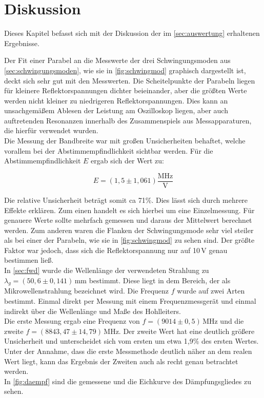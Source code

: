 

\section{Diskussion}
\label{sec:Diskussion}

Dieses Kapitel befasst sich mit der Diskussion der im \autoref{sec:auswertung} erhaltenen Ergebnisse.



Der Fit einer Parabel an die Messwerte der drei Schwingungsmoden aus \autoref{sec:schwingungsmoden}, wie sie in \autoref{fig:schwingmod} graphisch dargestellt ist, deckt sich sehr gut mit den Messwerten.
Die Scheitelpunkte der Parabeln liegen für kleinere Reflektorspannungen dichter beieinander, aber die größten Werte werden nicht kleiner zu niedrigeren Reflektorspannungen.
Dies kann an unsachgemäßem Ablesen der Leistung am Oszilloskop liegen, aber auch auftretenden Resonanzen innerhalb des Zusammenspiels aus Messapparaturen, die hierfür verwendet wurden.\\
Die Messung der Bandbreite war mit großen Unsicherheiten behaftet, welche vorallem bei der Abstimmempfindlichkeit sichtbar werden.
Für die Abstimmempfindlichkeit $E$ ergab sich der Wert zu:

\begin{equation}
E = (1,5 \pm 1,061) \frac{\text{MHz}}{\text{V}}
\label{eq:elbandbreite2}
\end{equation}

Die relative Unsicherheit beträgt somit ca 71\%. Dies lässt sich durch mehrere Effekte erklären. Zum einen handelt es sich hierbei um eine Einzelmessung.
Für genauere Werte sollte mehrfach gemessen und daraus der Mittelwert berechnet werden.
Zum anderen waren die Flanken der Schwingungsmode sehr viel steiler als bei einer der Parabeln, wie sie in \autoref{fig:schwingmod} zu sehen sind.
Der größte Faktor war jedoch, dass sich die Reflektorspannung nur auf 10\,V genau bestimmen ließ.\\

In \autoref{sec:fwd} wurde die Wellenlänge der verwendeten Strahlung zu $\lambda_g = (50,6 \pm 0,141)$\,mm bestimmt. Diese liegt in dem Bereich, der als Mikrowellenstrahlung bezeichnet wird.
Die Frequenz $f$ wurde auf zwei Arten bestimmt. Einmal direkt per Messung mit einem Frequenzmessgerät und einmal indirekt über die Wellenlänge und Maße des Hohlleiters.\\
Die erste Messung ergab eine Frequenz von $f = (9014 \pm 0,5)$\,MHz und die zweite $f = (8843,47 \pm 14,79)$\,MHz.
Der zweite Wert hat eine deutlich größere Unsicherheit und unterscheidet sich vom ersten um etwa 1,9\% des ersten Wertes.
Unter der Annahme, dass die erste Messmethode deutlich näher an dem realen Wert liegt, kann das Ergebnis der Zweiten auch als recht genau betrachtet werden.\\
In \autoref{fig:daempf} sind die gemessene und die Eichkurve des Dämpfungsgliedes zu sehen. 

